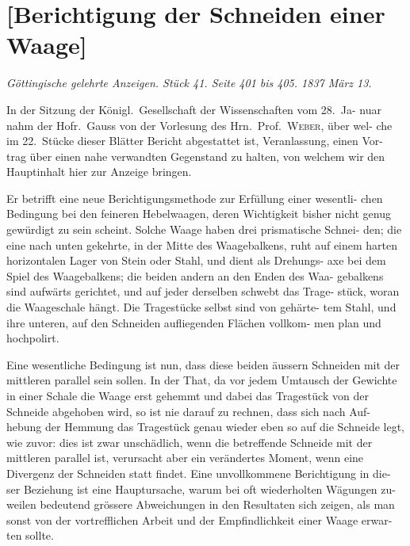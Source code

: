 \documentclass[12pt,a4paper]{article}
\begin{document}
\newpage
\section*{[Berichtigung der Schneiden einer Waage]}

\textit{Göttingische gelehrte Anzeigen. Stück 41. Seite 401 bis 405. 1837 März 13.}

In der Sitzung der Königl.\ Gesellschaft der Wissenschaften vom 28.\ Ja-
nuar nahm der Hofr.\ Gauss von der Vorlesung des Hrn.\ Prof.\ \textsc{Weber}, über wel-
che im 22.\ Stücke dieser Blätter Bericht abgestattet ist, Veranlassung, einen Vor-
trag über einen nahe verwandten Gegenstand zu halten, von welchem wir den 
Hauptinhalt hier zur Anzeige bringen.

Er betrifft eine neue Berichtigungsmethode zur Erfüllung einer wesentli-
chen Bedingung bei den feineren Hebelwaagen, deren Wichtigkeit bisher nicht 
genug gewürdigt zu sein scheint. Solche Waage haben drei prismatische Schnei-
den; die eine nach unten gekehrte, in der Mitte des Waagebalkens, ruht auf 
einem harten horizontalen Lager von Stein oder Stahl, und dient als Drehungs-
axe bei dem Spiel des Waagebalkens; die beiden andern an den Enden des Waa-
gebalkens sind aufwärts gerichtet, und auf jeder derselben schwebt das Trage-
stück, woran die Waageschale hängt. Die Tragestücke selbst sind von gehärte-
tem Stahl, und ihre unteren, auf den Schneiden aufliegenden Flächen vollkom-
men plan und hochpolirt.

Eine wesentliche Bedingung ist nun, dass diese beiden äussern Schneiden 
mit der mittleren parallel sein sollen. In der That, da vor jedem Umtausch der 
Gewichte in einer Schale die Waage erst gehemmt und dabei das Tragestück von 
der Schneide abgehoben wird, so ist nie darauf zu rechnen, dass sich nach Auf-
hebung der Hemmung das Tragestück genau wieder eben so auf die Schneide 
legt, wie zuvor: dies ist zwar unschädlich, wenn die betreffende Schneide mit 
der mittleren parallel ist, verursacht aber ein verändertes Moment, wenn eine 
Divergenz der Schneiden statt findet. Eine unvollkommene Berichtigung in die-
ser Beziehung ist eine Hauptursache, warum bei oft wiederholten Wägungen zu-
weilen bedeutend grössere Abweichungen in den Resultaten sich zeigen, als man 
sonst von der vortrefflichen Arbeit und der Empfindlichkeit einer Waage erwar-
ten sollte.
\end{document}
